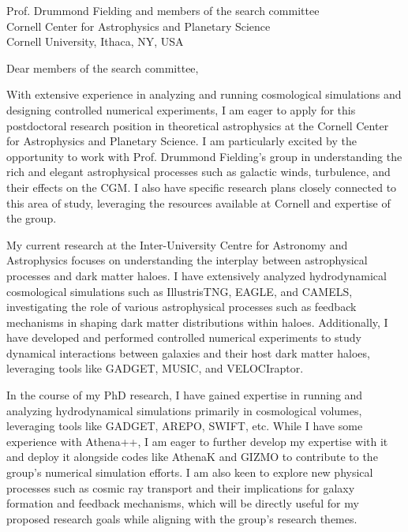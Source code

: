 \documentclass[11pt]{letter}
\begin{document}
\begin{letter}{Prof. Drummond Fielding and members of the search committee \\ Cornell Center for Astrophysics and Planetary Science \\ Cornell University, Ithaca, NY, USA}

\opening{Dear members of the search committee,}

With extensive experience in analyzing and running cosmological simulations and designing controlled numerical experiments, I am eager to apply for this postdoctoral research position in theoretical astrophysics at the Cornell Center for Astrophysics and Planetary Science. I am particularly excited by the opportunity to work with Prof. Drummond Fielding's group in understanding the rich and elegant astrophysical processes such as galactic winds, turbulence, and their effects on the CGM. I also have specific research plans closely connected to this area of study, leveraging the resources available at Cornell and expertise of the group.








My current research at the Inter-University Centre for Astronomy and Astrophysics focuses on understanding the interplay between astrophysical processes and dark matter haloes. I have extensively analyzed hydrodynamical cosmological simulations such as IllustrisTNG, EAGLE, and CAMELS, investigating the role of various astrophysical processes such as feedback mechanisms in shaping dark matter distributions within haloes. Additionally, I have developed and performed controlled numerical experiments to study dynamical interactions between galaxies and their host dark matter haloes, leveraging tools like GADGET, MUSIC, and VELOCIraptor.  

In the course of my PhD research, I have gained expertise in running and analyzing hydrodynamical simulations primarily in cosmological volumes, leveraging tools like GADGET, AREPO, SWIFT, etc. While I have some experience with Athena++, I am eager to further develop my expertise with it and deploy it  alongside codes like AthenaK and GIZMO to contribute to the group's numerical simulation efforts. I am also keen to explore new physical processes such as cosmic ray transport and their implications for galaxy formation and feedback mechanisms, which will be directly useful for my proposed research goals while aligning with the group's research themes.


\end{letter}
\end{document}
